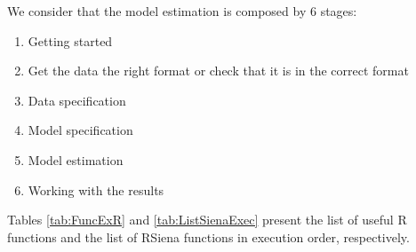 \documentclass[a4paper,fleqn,11pt]{article}
\newcommand{\+}{\, + \,}
\newcommand{\R}{{\sf R }}
\newcommand{\RS}{{\sf \textsf{RSiena} }}
\begin{document}
    We consider that the model estimation is composed by 6 stages:
\begin{enumerate}
    \item Getting started
    \item Get the data the right format or check that it is in the correct
      format
    \item Data specification
    \item Model specification
    \item   Model estimation
    \item   Working with the results
\end{enumerate}

Tables \ref{tab:FuncExR} and \ref{tab:ListSienaExec} present the list of useful
\R functions and the list of \RS functions in execution order, respectively.
\end{document}

